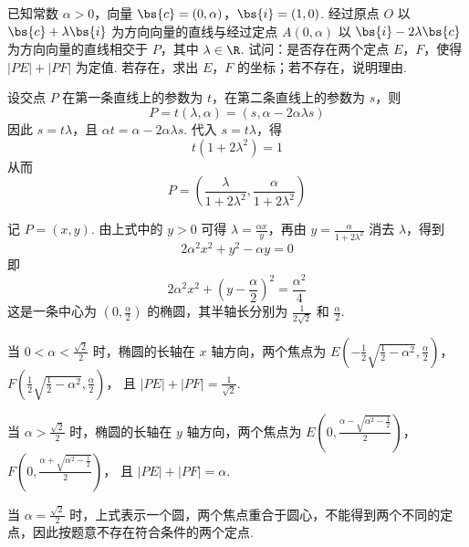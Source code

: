 \begin{problem}
已知常数 \(\alpha > 0\)，向量 \(\bs{c} = (0, \alpha)\)，\(\bs{i} = (1, 0)\). 经过原点 \(O\) 以 \(\bs{c} + \lambda \bs{i}\) 为方向向量的直线与经过定点 \(A(0, \alpha)\) 以 \(\bs{i} - 2\lambda \bs{c}\) 为方向向量的直线相交于 \(P\)，其中 \(\lambda \in \R\). 试问：是否存在两个定点 \(E\)，\(F\)，使得 \(|PE| + |PF|\) 为定值. 若存在，求出 \(E\)，\(F\) 的坐标；若不存在，说明理由.

\begin{solution}
设交点 \(P\) 在第一条直线上的参数为 \(t\)，在第二条直线上的参数为 \(s\)，则
\[
P=t(\lambda,\alpha)=(s,\alpha-2\alpha\lambda s)
\]
因此 \(s=t\lambda\)，且 \(\alpha t=\alpha-2\alpha\lambda s\). 代入 \(s=t\lambda\)，得
\[
t(1+2\lambda^{2})=1
\]
从而
\[
P=\left(\frac{\lambda}{1+2\lambda^{2}},\frac{\alpha}{1+2\lambda^{2}}\right)
\]

记 \(P=(x,y)\). 由上式中的 \(y>0\) 可得 \(\lambda=\frac{\alpha x}{y}\)，再由 \(y=\frac{\alpha}{1+2\lambda^{2}}\) 消去 \(\lambda\)，得到
\[
2\alpha^{2}x^{2}+y^{2}-\alpha y=0
\]
即
\[
2\alpha^{2}x^{2}+\left(y-\frac{\alpha}{2}\right)^{2}=\frac{\alpha^{2}}{4}
\]
这是一条中心为 \(\left(0,\frac{\alpha}{2}\right)\) 的椭圆，其半轴长分别为 \(\frac{1}{2\sqrt{2}}\) 和 \(\frac{\alpha}{2}\).

当 \(0<\alpha<\frac{\sqrt{2}}{2}\) 时，椭圆的长轴在 \(x\) 轴方向，两个焦点为
\(E\left(-\frac{1}{2}\sqrt{\frac{1}{2}-\alpha^{2}},\frac{\alpha}{2}\right)\)，\(F\left(\frac{1}{2}\sqrt{\frac{1}{2}-\alpha^{2}},\frac{\alpha}{2}\right)\)，
且 \(|PE|+|PF|=\frac{1}{\sqrt{2}}\).

当 \(\alpha>\frac{\sqrt{2}}{2}\) 时，椭圆的长轴在 \(y\) 轴方向，两个焦点为
\(E\left(0,\frac{\alpha-\sqrt{\alpha^{2}-\frac{1}{2}}}{2}\right)\)，\(F\left(0,\frac{\alpha+\sqrt{\alpha^{2}-\frac{1}{2}}}{2}\right)\)，
且 \(|PE|+|PF|=\alpha\).

当 \(\alpha=\frac{\sqrt{2}}{2}\) 时，上式表示一个圆，两个焦点重合于圆心，不能得到两个不同的定点，因此按题意不存在符合条件的两个定点.
\end{solution}
\end{problem}
